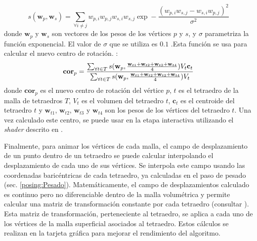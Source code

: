\begin{equation}
 s(\textbf{w}_p,\textbf{w}_s) = 
\sum_{\forall i \neq j} w_{p,i}w_{p,j}w_{s,i}w_{s,j}\exp-\frac{(w_{p,i}w_{s,j}-w_{s,i}w_{p,j})^2}{\sigma^2}
\end{equation}
\normalsize
%
donde $\textbf{w}_p$ y $\textbf{w}_s$ son vectores de los pesos de los vértices $p$ y $s$, y $\sigma$ parametriza la función exponencial. El valor de $\sigma$ que se utiliza es $0.1$ .Esta función se usa para calcular el nuevo centro de rotación. : 
%
\begin{equation}
\textbf{cor}_p = 
\frac
  {
  \sum_{\forall t \in T}
    s(\textbf{w}_p,
      \frac{\textbf{w}_{t1}+\textbf{w}_{t2}+\textbf{w}_{t3}+\textbf{w}_{t4}}{4})
    V_t\mathbf{c}_t
  }
  {
  \sum_{\forall t \in T}
    s(\textbf{w}_p,
      \frac{\textbf{w}_{t1}+\textbf{w}_{t2}+\textbf{w}_{t3}+\textbf{w}_{t4}}{4})
    V_t
  } 
\normalsize
\end{equation}
%
donde $\textbf{cor}_p$ es el nuevo centro de rotación del vértice $p$, $t$ es el tetraedro de la malla de tetraedros $T$, $V_t$ es el volumen del tetraedro $t$, $\textbf{c}_t$ es el centroide del tetraedro $t$ y $\textbf{w}_{t1}$, $\textbf{w}_{t2}$, $\textbf{w}_{t3}$ y $\textbf{w}_{t4}$ son los pesos de los vértices del tetraedro $t$. Una vez calculado este centro, se puede usar en la etapa interactiva utilizando el \emph{shader} descrito en \cite{le2016real}.

Finalmente, para animar los vértices de cada malla, el campo de desplazamiento de un punto dentro de un tetraedro se puede calcular interpolando el desplazamiento de cada uno de sus vértices. Se interpola este campo usando las coordenadas baricéntricas de cada tetraedro, ya calculadas en el paso de pesado (sec. \ref{posing:Pesado}). Matemáticamente, el campo de desplazamientos calculado es continuo pero no diferenciable dentro de la malla volumétrica y permite calcular una matriz de transformación constante por cada tetraedro (consultar \cite{Muller2004}). Esta matriz de transformación, perteneciente al tetraedro, se aplica a cada uno de los vértices de la malla superficial asociados al tetraedro. Estos cálculos se realizan en la tarjeta gráfica para mejorar el rendimiento del algoritmo.

